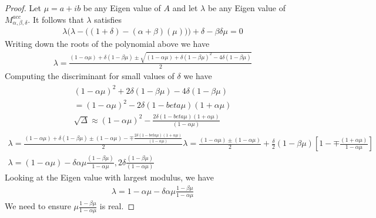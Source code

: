 \begin{proof}
Let $\mu=a+ib$ be any Eigen value of $A$ and let $\lambda$ be any Eigen value of $M^{acc}_{\alpha,\beta,\delta}$. It follows that $\lambda$ satisfies
\begin{align}\label{poly}
\lambda \Big(\lambda- \big((1+\delta)-(\alpha+\beta)(\mu) \big) \Big)+ \delta-\beta\delta \mu=0
\end{align}
Writing down the roots of the polynomial above we have
\begin{align}
\lambda=\frac{(1-\alpha \mu)+\delta (1-\beta\mu)\pm \sqrt{(1-\alpha \mu)+\delta (1-\beta\mu)^2-4\delta(1-\beta\mu)}}{2}
\end{align}
Computing the discriminant for small values of $\delta$ we have
\begin{align}
\begin{split}
(1-\alpha\mu)^2+2\delta(1-\beta \mu)-4\delta(1-\beta\mu)\\
=(1-\alpha\mu)^2-2\delta(1-beta\mu)(1+\alpha\mu)\\
\sqrt\Delta\approx(1-\alpha\mu)^2-\frac{2\delta(1-beta\mu)(1+\alpha\mu)}{(1-\alpha\mu)}
\end{split}
\end{align}
\begin{align}
\lambda=\frac{(1-\alpha\mu)+\delta(1-\beta\mu)\pm(1-\alpha\mu)-\mp\frac{2\delta(1-beta\mu)(1+\alpha\mu)}{(1-\alpha\mu)}}{2}
\lambda=\frac{(1-\alpha\mu)\pm(1-\alpha\mu)}{2} +\frac{\delta}{2}(1-\beta\mu)[1-\mp\frac{(1+\alpha\mu)}{1-\alpha \mu}]\\
\lambda=(1-\alpha\mu)-\delta\alpha\mu\frac{(1-\beta\mu)}{1-\alpha\mu}, 2\delta\frac{(1-\beta\mu)}{(1-\alpha \mu)}
\end{align}
Looking at the Eigen value with largest modulus, we have
\begin{align}
\lambda=1-\alpha\mu-\delta\alpha\mu\frac{1-\beta\mu}{1-\alpha \mu}
\end{align}
We need to ensure $\mu\frac{1-\beta\mu}{1-\alpha \mu}$ is real.

\end{proof}




